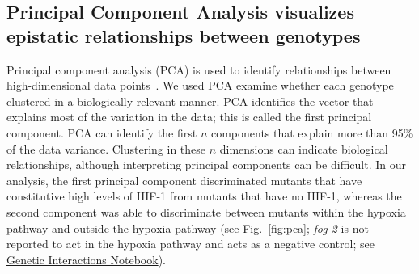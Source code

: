 \documentclass[9pt,twocolumn,twoside]{pnas-new}
\newcommand{\gene}[1]{\mbox{\emph{#1}}}
\newcommand{\fog}{\gene{fog-2(lf)}}
\newcommand{\egl}{\gene{egl-9(lf)}}
\newcommand{\rhy}{\gene{rhy-1(lf)}}
\newcommand{\vhl}{\gene{vhl-1(lf)}}
\newcommand{\eglvhl}{\gene{egl-9(lf); vhl-1(lf)}}
\newcommand{\eglhif}{\gene{egl-9(lf) hif-1(lf)}}
\newcommand{\hif}{\gene{hif-1(lf)}}
\newcommand{\hifp}{HIF-1}
\begin{document}
\subsection*{Principal Component Analysis visualizes epistatic relationships
             between genotypes}
\label{sub:Clustering}

Principal component analysis (PCA) is used to identify relationships between
high-dimensional data points~\cite{Yeung2001}. We used PCA
examine whether each genotype clustered in a biologically relevant manner. PCA
identifies the vector that explains most of the variation in the data; this
is called the first principal component. PCA can identify the first
$n$ components that explain more than 95\% of the data variance.
Clustering in these $n$ dimensions can indicate biological
relationships, although interpreting principal components can be
difficult.
In our analysis, the first principal component discriminated mutants
that have constitutive high levels of \hifp{} from mutants that have no \hifp{},
whereas the second component was able to discriminate between mutants within the
hypoxia pathway and outside the hypoxia pathway (see Fig.~\ref{fig:pca};
\gene{fog-2} is not reported to act in the hypoxia pathway and acts as a
negative control; see
\href{https://wormlabcaltech.github.io/mprsq/analysis_notebooks/2_predict_interactions.html}
{Genetic Interactions Notebook}).
\end{document}
